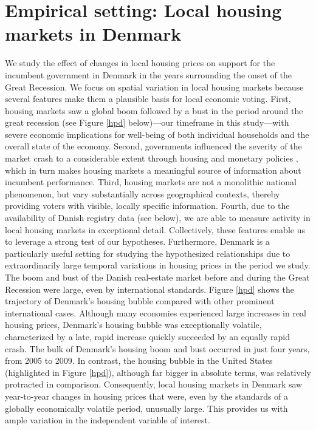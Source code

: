 \documentclass[12pt,a4paper]{article}
\begin{document}
	\section{Empirical setting: Local housing markets in Denmark}
	We study the effect of changes in local housing prices on support for the incumbent government in Denmark in the years surrounding the onset of the Great Recession. We focus on spatial variation in local housing markets because several features make them a plausible basis for local economic voting. First, housing markets saw a global boom followed by a bust in the period around the great recession (see Figure \ref{hpd} below)—our timeframe in this study—with severe economic implications for well-being of both individual households and the overall state of the economy. Second, governments influenced the severity of the market crash to a considerable extent through housing and monetary policies \citep{dam2011housing}, which in turn makes housing markets a meaningful source of information about incumbent performance. Third, housing markets are not a monolithic national phenomenon, but vary substantially across geographical contexts, thereby providing voters with visible, locally specific information. Fourth, due to the availability of Danish registry data (see below), we are able to measure activity in local housing markets in exceptional detail. Collectively, these features enable us to leverage a strong test of our hypotheses.
	Furthermore, Denmark is a particularly useful setting for studying the hypothesized relationships due to extraordinarily large temporal variations in housing prices in the period we study. The boom and bust of the Danish real-estate market before and during the Great Recession were large, even by international standards. Figure \ref{hpd} shows the trajectory of Denmark's housing bubble compared with other prominent international cases. Although many economies experienced large increases in real housing prices, Denmark's housing bubble was exceptionally volatile, characterized by a late, rapid increase quickly succeeded by an equally rapid crash. The bulk of Denmark's housing boom and bust occurred in just four years, from 2005 to 2009. In contrast, the housing bubble in the United States (highlighted in Figure \ref{hpd}), although far bigger in absolute terms, was relatively protracted in comparison. Consequently, local housing markets in Denmark saw year-to-year changes in housing prices that were, even by the standards of a globally economically volatile period, unusually large. This provides us with ample variation in the independent variable of interest.
	
\end{document}
